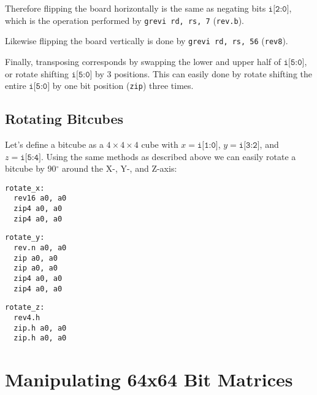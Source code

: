 Therefore flipping the board horizontally is the same as negating bits $\texttt{i[2:0]}$,
which is the operation performed by {\tt grevi rd, rs, 7} ({\tt rev.b}).

Likewise flipping the board vertically is done by {\tt grevi rd, rs, 56} ({\tt rev8}).

Finally, transposing corresponds by swapping the lower and upper half of $\texttt{i[5:0]}$,
or rotate shifting $\texttt{i[5:0]}$ by 3 positions. This can easily done by rotate shifting the entire
$\texttt{i[5:0]}$ by one bit position ({\tt zip}) three times.

\subsection{Rotating Bitcubes}

Let's define a bitcube as a $4 \times 4 \times 4$ cube with $x=\texttt{i[1:0]}$,
$y=\texttt{i[3:2]}$, and $z=\texttt{i[5:4]}$. Using the same methods as described
above we can easily rotate a bitcube by 90$^\circ$ around the X-, Y-, and Z-axis:

\begin{multicols}{3}
\begin{minipage}{\linewidth}
\begin{verbatim}
rotate_x:
  rev16 a0, a0
  zip4 a0, a0
  zip4 a0, a0
\end{verbatim}
\end{minipage}

\begin{minipage}{\linewidth}
\begin{verbatim}
rotate_y:
  rev.n a0, a0
  zip a0, a0
  zip a0, a0
  zip4 a0, a0
  zip4 a0, a0
\end{verbatim}
\end{minipage}

\begin{minipage}{\linewidth}
\begin{verbatim}
rotate_z:
  rev4.h
  zip.h a0, a0
  zip.h a0, a0
\end{verbatim}
\end{minipage}
\end{multicols}


\section{Manipulating 64x64 Bit Matrices}
\label{bmat64}

